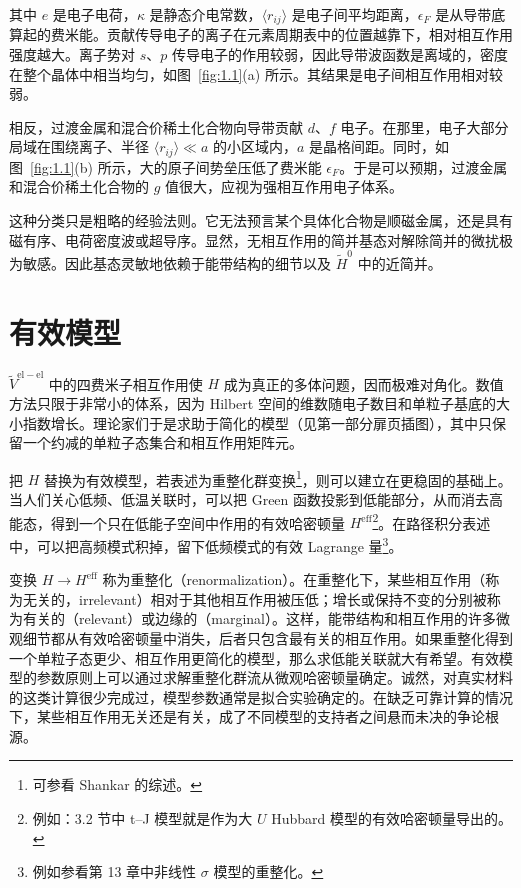 其中 $e$ 是电子电荷，$\kappa$ 是静态介电常数，$\langle r_{ij}\rangle$ 是电子间平均距离，$\epsilon_{F}$ 是从导带底算起的费米能。贡献传导电子的离子在元素周期表中的位置越靠下，相对相互作用强度越大。离子势对 $s$、$p$ 传导电子的作用较弱，因此导带波函数是离域的，密度在整个晶体中相当均匀，如图~\ref{fig:1.1}(a) 所示。其结果是电子间相互作用相对较弱。

相反，过渡金属和混合价稀土化合物向导带贡献 $d$、$f$ 电子。在那里，电子大部分局域在围绕离子、半径 $\langle r_{ij}\rangle \ll a$ 的小区域内，$a$ 是晶格间距。同时，如图~\ref{fig:1.1}(b) 所示，大的原子间势垒压低了费米能 $\epsilon_{F}$。于是可以预期，过渡金属和混合价稀土化合物的 $g$ 值很大，应视为强相互作用电子体系。

这种分类只是粗略的经验法则。它无法预言某个具体化合物是顺磁金属，还是具有磁有序、电荷密度波或超导序。显然，无相互作用的简并基态对解除简并的微扰极为敏感。因此基态灵敏地依赖于能带结构的细节以及 $\tilde{H}^{0}$ 中的近简并。

\section{有效模型}

$\tilde{V}^{\mathrm{el-el}}$ 中的四费米子相互作用使 $H$ 成为真正的多体问题，因而极难对角化。数值方法只限于非常小的体系，因为 Hilbert 空间的维数随电子数目和单粒子基底的大小指数增长。理论家们于是求助于简化的模型（见第一部分扉页插图），其中只保留一个约减的单粒子态集合和相互作用矩阵元。

把 $H$ 替换为有效模型，若表述为重整化群变换\footnote{可参看 Shankar 的综述。}，则可以建立在更稳固的基础上。当人们关心低频、低温关联时，可以把 Green 函数投影到低能部分，从而消去高能态，得到一个只在低能子空间中作用的有效哈密顿量 $H^{\mathrm{eff}}$\footnote{例如：3.2 节中 t--J 模型就是作为大 $U$ Hubbard 模型的有效哈密顿量导出的。}。在路径积分表述中，可以把高频模式积掉，留下低频模式的有效 Lagrange 量\footnote{例如参看第 13 章中非线性 $\sigma$ 模型的重整化。}。

变换 $H \rightarrow H^{\mathrm{eff}}$ 称为重整化（renormalization）。在重整化下，某些相互作用（称为无关的，irrelevant）相对于其他相互作用被压低；增长或保持不变的分别被称为有关的（relevant）或边缘的（marginal）。这样，能带结构和相互作用的许多微观细节都从有效哈密顿量中消失，后者只包含最有关的相互作用。如果重整化得到一个单粒子态更少、相互作用更简化的模型，那么求低能关联就大有希望。有效模型的参数原则上可以通过求解重整化群流从微观哈密顿量确定。诚然，对真实材料的这类计算很少完成过，模型参数通常是拟合实验确定的。在缺乏可靠计算的情况下，某些相互作用无关还是有关，成了不同模型的支持者之间悬而未决的争论根源。

